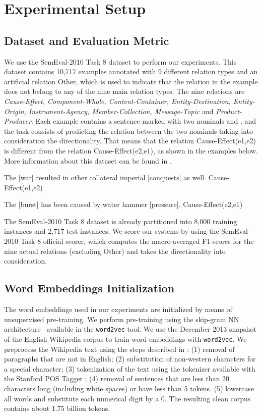 \documentclass[11pt]{article}
\begin{document}
 \section{Experimental Setup}
\label{sec:experimental_setup}

\subsection{Dataset and Evaluation Metric}
We use the SemEval-2010 Task 8 dataset to perform our experiments.
This dataset contains 10,717 examples annotated with 9 different relation types and an artificial relation Other,
which is used to indicate that the relation in the example does not belong to any of the nine main relation types.
The nine relations are \emph{Cause-Effect, 
Component-Whole, 
Content-Container,
Entity-Destination,
Entity-Origin,
Instrument-Agency,
Member-Collection,
Message-Topic}
and \emph{Product-Producer}.
Each example contains a sentence marked with two nominals  and ,
and the task consists of predicting the relation between the two nominals taking into consideration the directionality.
That means that the relation Cause-Effect(e1,e2) is different from the relation Cause-Effect(e2,e1), as shown in the examples below.
More information about this dataset can be found in \cite{hendrickx2010:semeval}.

\begin{center}
\begin{small}
The [war] resulted in other collateral imperial [conquests] as well.  Cause-Effect(e1,e2)

The [burst] has been caused by water hammer [pressure].  Cause-Effect(e2,e1)
\end{small}
\end{center}

The SemEval-2010 Task 8 dataset is already partitioned into 8,000 training instances and 2,717 test instances.
We score our systems by using the SemEval-2010 Task 8 official scorer, which computes the macro-averaged F1-scores for the nine actual relations (excluding Other) and takes the directionality into consideration.

\subsection{Word Embeddings Initialization}
The word embeddings used in our experiments are initialized by means of unsupervised pre-training.
We perform pre-training using the skip-gram NN architecture~\cite{mikolov:2013} available in the \texttt{word2vec} tool.
We use the December 2013 snapshot of the English Wikipedia corpus to train word embeddings with \texttt{word2vec}.
We preprocess the Wikipedia text using the steps described in \cite{santos2014:coling}:
(1) removal of paragraphs that are not in English;
(2) substitution of non-western characters for a special character;
(3) tokenization of the text using the tokenizer available with the Stanford POS Tagger \cite{toutanova2003:naacl};
(4) removal of sentences that are less than 20 characters long (including white spaces) or have less than 5 tokens.
(5) lowercase all words and substitute each numerical digit by a 0.
The resulting clean corpus contains about 1.75 billion tokens.
\end{document}
